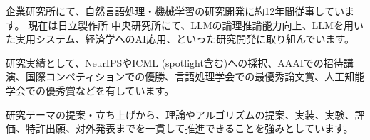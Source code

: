 企業研究所にて、自然言語処理・機械学習の研究開発に約12年間従事しています。
現在は日立製作所 中央研究所にて、LLMの論理推論能力向上、LLMを用いた実用システム、経済学へのAI応用、といった研究開発に取り組んでいます。

\vspace{2mm}
研究実績として、NeurIPSやICML (spotlight含む)への採択、AAAIでの招待講演、国際コンペティションでの優勝、言語処理学会での最優秀論文賞、人工知能学会での優秀賞などを有しています。

\vspace{2mm}
研究テーマの提案・立ち上げから、理論やアルゴリズムの提案、実装、実験、評価、特許出願、対外発表までを一貫して推進できることを強みとしています。
